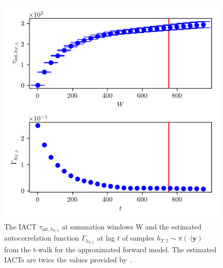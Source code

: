 \begin{figure}[ht!]
	\centering
	\includegraphics{UwerrTauIntTWalk14.png}
	\caption[IACT and autocorrelation function of samples $h_{T,5} \sim \pi(\cdot|\bm{y})$, for approximated model.]{The IACT $\tau_{\text{int},h_{T,5}}$ at summation windows W and the estimated autocorrelation function $\Gamma_{h_{T,5}}$ at lag $t$ of samples $h_{T,5} \sim \pi( \cdot| \bm{y})$ from the t-walk for the approximated forward model.
	The estimated IACTs are twice the values provided by~\cite{drikHesse, UwerrM}.}
	\label{fig:TWalkIATC15}
\end{figure}

